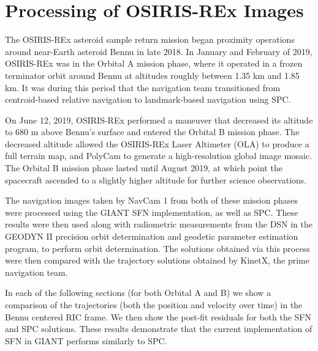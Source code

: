 \documentclass{src/RPI-SIW}
\begin{document}
\section*{Processing of OSIRIS-REx Images}
The OSIRIS-REx asteroid sample return mission began proximity operations around near-Earth asteroid Bennu in late 2018.  In January and February of 2019, OSIRIS-REx was in the Orbital A mission phase, where it operated in a frozen terminator orbit around Bennu at altitudes roughly between 1.35 km and 1.85 km.  It was during this period that the navigation team transitioned from centroid-based relative navigation to landmark-based navigation using SPC.

On June 12, 2019, OSIRIS-REx performed a maneuver that decreased its altitude to 680 m above Bennu's surface and entered the Orbital B mission phase.  The decreased altitude allowed the OSIRIS-REx Laser Altimeter (OLA)\cite{ola} to produce a full terrain map, and PolyCam\cite{ocams} to generate a high-resolution global image mosaic.  The Orbital B mission phase lasted until August 2019, at which point the spacecraft ascended to a slightly higher altitude for further science observations.

The navigation images taken by NavCam 1\cite{tagcams} from both of these mission phases were processed using the GIANT SFN implementation, as well as SPC.  These results were then used along with radiometric measurements from the DSN in the GEODYN II precision orbit determination and geodetic parameter estimation program, to perform orbit determination.  The solutions obtained via this process were then compared with the trajectory solutions obtained by KinetX, the prime navigation team.

In each of the following sections (for both Orbital A and B) we show a comparison of the trajectories (both the position and velocity over time) in the Bennu centered RIC frame.  We then show the post-fit residuals for both the SFN and SPC solutions. These results demonstrate that the current implementation of SFN in GIANT performs similarly to SPC.
\end{document}
